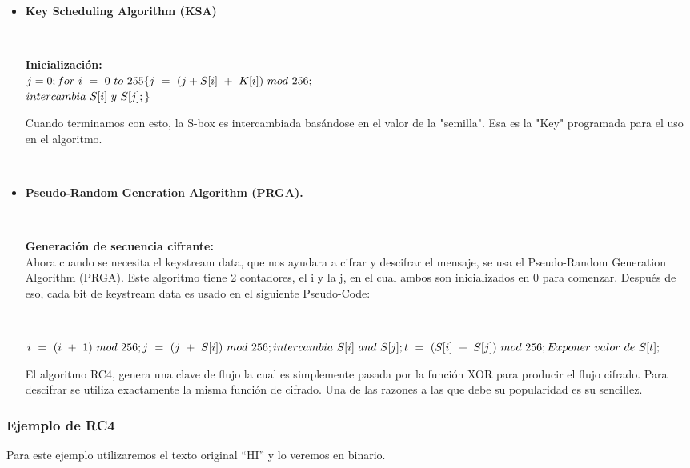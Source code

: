 \documentclass[11pt, conference]{IEEEtran}
\begin{document}
\begin{itemize}
	\item \textbf{Key Scheduling Algorithm (KSA)}
	
	\
	
	\textbf{Inicialización:}\\
		$
		j=0;\\
		for\ i\ =\ 0\ to\ 255\\
		\{\\
		j\ =\ (j+S[i]\ +\ K[i])\ mod\ 256;$\\
		$intercambia\ S[i]\ y\ S[j];\\
		\}\\
		$
	\
	
	Cuando terminamos con esto, la S-box es intercambiada basándose en el valor de la "semilla". Esa es la "Key" programada para el uso en el algoritmo.
	
	\
	
	\item \textbf{Pseudo-Random Generation Algorithm (PRGA).}
	
	\
	
	\textbf{Generación de secuencia cifrante:}\\
	Ahora cuando se necesita el keystream data, que nos ayudara a cifrar y descifrar el mensaje, se usa el Pseudo-Random Generation Algorithm (PRGA). Este algoritmo tiene 2 contadores, el i y la j, en el cual ambos son inicializados en 0 para comenzar. Después de eso, cada bit de keystream data es usado en el siguiente Pseudo-Code:
	
	\
	
	$
	i\ =\ (i\ +\ 1)\ mod\ 256;\\
	j\ =\ (j\ +\ S[i])\ mod\ 256;\\
	intercambia\ S[i]\ and\ S[j];\\
	t\ =\ (S[i]\ +\ S[j])\ mod\ 256;\\
	Exponer\ valor\ de\ S[t];\\
	$
	
	
	El algoritmo RC4, genera una clave de flujo la cual es simplemente pasada por
	la función XOR para producir el flujo cifrado. Para descifrar se utiliza
	exactamente la misma función de cifrado. Una de las razones a las que
	debe su popularidad es su sencillez.	
\end{itemize}

\subsubsection{Ejemplo de RC4}
Para este ejemplo utilizaremos el texto original “HI” y lo veremos en binario.
\end{document}
